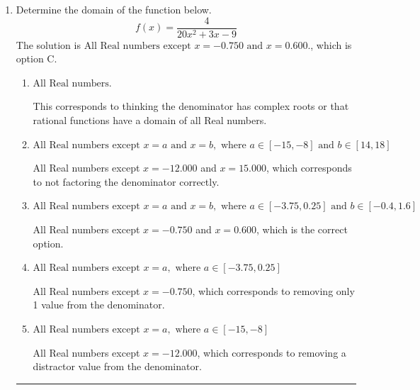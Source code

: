 \documentclass{extbook}[14pt]
\newcommand{\litem}[1]{\item #1

\rule{\textwidth}{0.4pt}}
\begin{document}
\begin{enumerate}\litem{
Determine the domain of the function below.
\[ f(x) = \frac{4}{20x^{2} +3 x -9} \]The solution is \( \text{All Real numbers except } x = -0.750 \text{ and } x = 0.600. \), which is option C.\begin{enumerate}[label=\Alph*.]
\item \( \text{All Real numbers.} \)

This corresponds to thinking the denominator has complex roots or that rational functions have a domain of all Real numbers.
\item \( \text{All Real numbers except } x = a \text{ and } x = b, \text{ where } a \in [-15, -8] \text{ and } b \in [14, 18] \)

All Real numbers except $x = -12.000$ and $x = 15.000$, which corresponds to not factoring the denominator correctly.
\item \( \text{All Real numbers except } x = a \text{ and } x = b, \text{ where } a \in [-3.75, 0.25] \text{ and } b \in [-0.4, 1.6] \)

All Real numbers except $x = -0.750$ and $x = 0.600$, which is the correct option.
\item \( \text{All Real numbers except } x = a, \text{ where } a \in [-3.75, 0.25] \)

All Real numbers except $x = -0.750$, which corresponds to removing only 1 value from the denominator.
\item \( \text{All Real numbers except } x = a, \text{ where } a \in [-15, -8] \)

All Real numbers except $x = -12.000$, which corresponds to removing a distractor value from the denominator.
\end{enumerate}

}
\end{enumerate}
\end{document}
